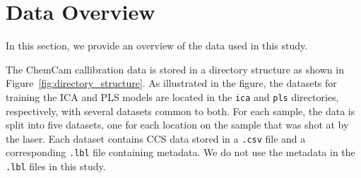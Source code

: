 \section{Data Overview}\label{sec:data_overview}
In this section, we provide an overview of the data used in this study.

The ChemCam callibration data is stored in a directory structure as shown in Figure~\ref{fig:directory_structure}.
As illustrated in the figure, the datasets for training the ICA and PLS models are located in the \texttt{ica} and \texttt{pls} directories, respectively, with several datasets common to both.
For each sample, the data is split into five datasets, one for each location on the sample that was shot at by the laser.
Each dataset contains CCS data stored in a \texttt{.csv} file and a corresponding \texttt{.lbl} file containing metadata.
We do not use the metadata in the \texttt{.lbl} files in this study.

